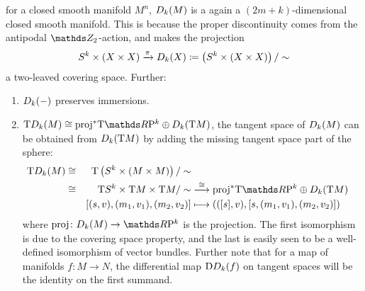 \begin{Rem}
\begin{enumerate}
    for a closed smooth manifold $M^n$, $D_{k}({M})$ is a
    again a $(2m+k)$-dimensional closed smooth manifold.
    This is because the proper discontinuity comes from the antipodal
    $\Zmod2$-action, and makes the projection
    \begin{gather*}
      S^{k}\times(X\times X)
      \xrightarrow{\pi}
      D_{k}({X})
      \coloneqq
      \left( S^{k}\times(X\times X) \right)/\sim
    \end{gather*}
    a two-leaved covering space.
    Further:
    \begin{enumerate}
    \item\label{item:twistedprodpreservesimmersions}
      $D_{k}({-})$ preserves immersions.
    \item\label{item:twistedprod:tangentspace}
      $\T\Twistedprod{k}{M}
      \cong \pb\proj\T{\RP k} \oplus \Twistedprod{k}{\T M}$,
      \idest the tangent space of $D_{k}({M})$ can be obtained
      from $D_{k}({\mathrm{T}M})$ by adding the missing tangent space
      part of the sphere:
      \begin{alignat*}{4}
        \T{\Twistedprod{k}{M}}
        &\cong& \T{\left(\Twistedprodcovspace{k}{M}\right)}/\sim \\
        &\cong& \T \Sphere k\times \T M\times\T M/\sim
        &\overset{\cong}{\longto}
        \pb\proj \T{\RP k} \oplus \Twistedprod{k}{\T M}
        \\
        &&[(s,v), (m_1,v_1), (m_2,v_2)]
        &\longmapsto
          \left( ([s], v), [s, (m_1,v_1), (m_2, v_2)] \right)
      \end{alignat*}
      where $\proj\colon\Twistedprod{k}{M}\to\RP k$ is the projection.
      The first isomorphism is due to the covering space property, and
      the last is easily seen to be a well-defined isomorphism of
      vector bundles.
      Further note that for a map of manifolds $f\colon M\to N$,
      the differential map $\mathrm{D}D_{k}({f})$ on tangent spaces
      will be the identity on the first summand.
    \end{enumerate}
  \end{enumerate}
\end{Rem}

